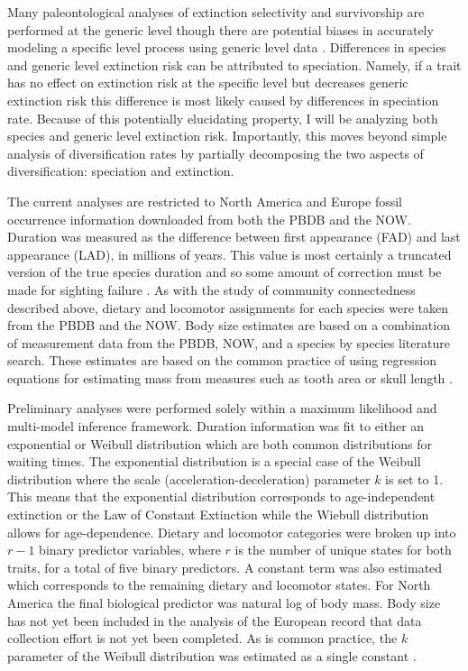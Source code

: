 \documentclass[11pt,letterpaper]{article}
\begin{document}
Many paleontological analyses of extinction selectivity and survivorship are performed at the generic level \citep{Tomiya2013,Liow2008,Harnik2013,Finnegan2008,Foote2006} though there are potential biases in accurately modeling a specific level process using generic level data \citep{Raup1975,Sepkoski1975,Simpson2006,Raup1991a,VanValen1979}. Differences in species and generic level extinction risk can be attributed to speciation. Namely, if a trait has no effect on extinction risk at the specific level but decreases generic extinction risk this difference is most likely caused by differences in speciation rate. Because of this potentially elucidating property, I will be analyzing both species and generic level extinction risk. Importantly, this moves beyond simple analysis of diversification rates by partially decomposing the two aspects of diversification: speciation and extinction.

The current analyses are restricted to North America and Europe fossil occurrence information downloaded from both the PBDB and the NOW. Duration was measured as the difference between first appearance (FAD) and last appearance (LAD), in millions of years. This value is most certainly a truncated version of the true species duration and so some amount of correction must be made for sighting failure \citep{Alroy2014a,Solow1997,Strauss1989}. As with the study of community connectedness described above, dietary and locomotor assignments for each species were taken from the PBDB and the NOW. Body size estimates are based on a combination of measurement data from the PBDB, NOW, and a species by species literature search. These estimates are based on the common practice of using regression equations for estimating mass from measures such as tooth area or skull length \citep{Alroy1998,Tomiya2013,Jernvall2004,Alroy2009,Slater2013a}. 

Preliminary analyses were performed solely within a maximum likelihood and multi-model inference framework. Duration information was fit to either an exponential or Weibull distribution which are both common distributions for waiting times. The exponential distribution is a special case of the Weibull distribution where the scale (acceleration-deceleration) parameter \(k\) is set to 1. This means that the exponential distribution corresponds to age-independent extinction or the Law of Constant Extinction \citep{VanValen1973} while the Wiebull distribution allows for age-dependence. Dietary and locomotor categories were broken up into \(r - 1\) binary predictor variables, where \(r\) is the number of unique states for both traits, for a total of five binary predictors. A constant term was also estimated which corresponds to the remaining dietary and locomotor states. For North America the final biological predictor was natural log of body mass. Body size has not yet been included in the analysis of the European record that data collection effort is not yet been completed. As is common practice, the \(k\) parameter of the Weibull distribution was estimated as a single constant \citep{Kleinbaum2005}.
\end{document}
